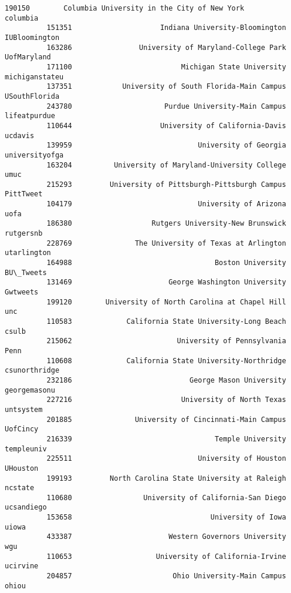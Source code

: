 \documentclass[11pt]{article}
\begin{document}
\begin{Verbatim}[commandchars=\\\{\}]
          190150        Columbia University in the City of New York         columbia   
          151351                     Indiana University-Bloomington    IUBloomington   
          163286                University of Maryland-College Park      UofMaryland   
          171100                          Michigan State University   michiganstateu   
          137351            University of South Florida-Main Campus    USouthFlorida   
          243780                      Purdue University-Main Campus     lifeatpurdue   
          110644                     University of California-Davis          ucdavis   
          139959                              University of Georgia   universityofga   
          163204          University of Maryland-University College             umuc   
          215293         University of Pittsburgh-Pittsburgh Campus        PittTweet   
          104179                              University of Arizona             uofa   
          186380                   Rutgers University-New Brunswick        rutgersnb   
          228769               The University of Texas at Arlington      utarlington   
          164988                                  Boston University        BU\_Tweets   
          131469                       George Washington University         Gwtweets   
          199120        University of North Carolina at Chapel Hill              unc   
          110583             California State University-Long Beach            csulb   
          215062                         University of Pennsylvania             Penn   
          110608             California State University-Northridge    csunorthridge   
          232186                            George Mason University     georgemasonu   
          227216                          University of North Texas        untsystem   
          201885               University of Cincinnati-Main Campus         UofCincy   
          216339                                  Temple University       templeuniv   
          225511                              University of Houston         UHouston   
          199193         North Carolina State University at Raleigh          ncstate   
          110680                 University of California-San Diego       ucsandiego   
          153658                                 University of Iowa            uiowa   
          433387                       Western Governors University              wgu   
          110653                    University of California-Irvine         ucirvine   
          204857                        Ohio University-Main Campus            ohiou   

\end{Verbatim}
\end{document}

